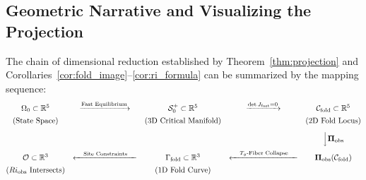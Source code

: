 \subsection{Geometric Narrative and Visualizing the Projection}

The chain of dimensional reduction established by Theorem~\ref{thm:projection} and Corollaries~\ref{cor:fold_image}--\ref{cor:ri_formula} can be summarized by the mapping sequence:
\begin{equation}
\begin{matrix}
\Omega_0 \subset \mathbb{R}^5 & \xrightarrow{\text{Fast Equilibrium}} & \mathcal{S}_0^+ \subset \mathbb{R}^5 & \xrightarrow{\det J_{\mathrm{fast}} = 0} & \mathcal{C}_{\mathrm{fold}} \subset \mathbb{R}^5 \\[4pt]
\text{(State Space)} & & \text{(3D Critical Manifold)} & & \text{(2D Fold Locus)} \\[8pt]
& & & & \Big\downarrow \boldsymbol{\Pi}_{\mathrm{obs}} \\[8pt]
\mathcal{O} \subset \mathbb{R}^3 & \xleftarrow{\quad \text{Site Constraints} \quad} & \Gamma_{\mathrm{fold}} \subset \mathbb{R}^3 & \xleftarrow{\quad T_g \text{-Fiber Collapse} \quad} & \boldsymbol{\Pi}_{\mathrm{obs}}(\mathcal{C}_{\mathrm{fold}}) \\[4pt]
\text{($Ri_{\mathrm{obs}}$ Intersects)} & & \text{(1D Fold Curve)} & &
\end{matrix}
\end{equation}

